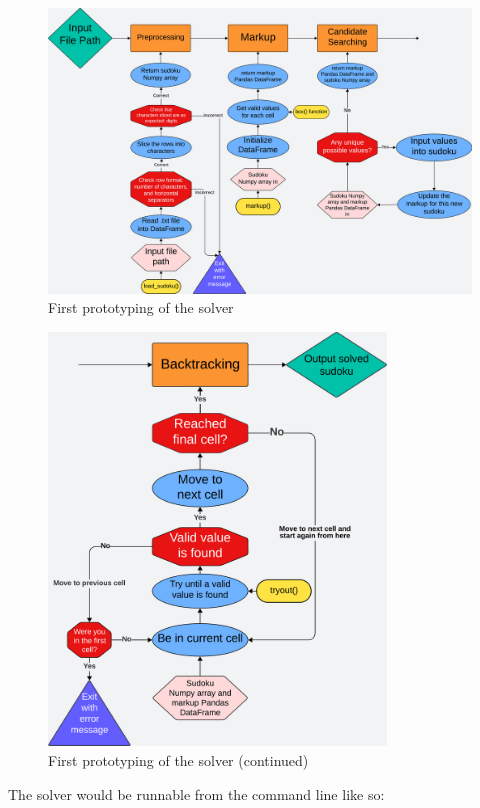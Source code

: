 \documentclass[12pt]{report} %
\begin{document}
\begin{figure}[bthp]
  \centering
  \includegraphics[width=\textwidth]{prototyping1.png}
  \caption{First prototyping of the solver}
\end{figure}

\begin{figure}[bthp]
  \centering
  \includegraphics[width=0.8\textwidth]{prototyping1_next.png}
  \caption{First prototyping of the solver (continued)}
\end{figure}

\newpage
The solver would be runnable from the command line like so:
\end{document}
